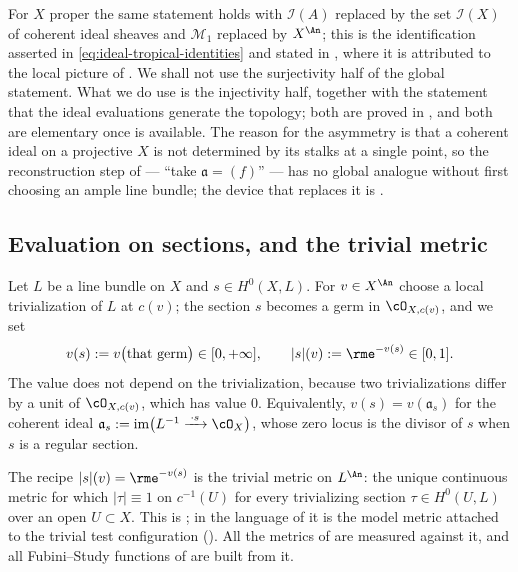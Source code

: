 \begin{remark}
\label{rem:ch32-global-tropical}
For $X$ proper the same statement holds with $\mathcal I(A)$ replaced by
the set $\mathcal I(X)$ of coherent ideal sheaves and
$\mathcal M_1$ replaced by $X^{\An}$; this is the identification asserted
in \eqref{eq:ideal-tropical-identities} and stated in
\cite[\S1.1.3]{BJ22}, where it is attributed to the local picture of
\cite[\S1.2]{JM12}.  We shall not use the surjectivity half of the global
statement.  What we do use is the injectivity half, together with the
statement that the ideal evaluations generate the topology; both are proved
in , and both are elementary once
 is available.  The reason for the asymmetry is
that a coherent ideal on a projective $X$ is not determined by its stalks
at a single point, so the reconstruction step of
 --- ``take $\mathfrak a=(f)$'' --- has
no global analogue without first choosing an ample line bundle; the device
that replaces it is .
\end{remark}

\subsection{Evaluation on sections, and the trivial metric}
\label{sec:ch32-sections}

Let $L$ be a line bundle on $X$ and $s\in H^0(X,L)$.  For
$v\in X^{\An}$ choose a local trivialization of $L$ at $c(v)$; the
section $s$ becomes a germ in $\cO_{X,c(v)}$, and we set
\[
 v(s):=v\bigl(\text{that germ}\bigr)\in[0,+\infty],
 \qquad
 |s|(v):=\rme^{-v(s)}\in[0,1].
\]
The value does not depend on the trivialization, because two trivializations
differ by a unit of $\cO_{X,c(v)}$, which has value $0$.  Equivalently,
$v(s)=v(\mathfrak a_s)$ for the coherent ideal
$\mathfrak a_s:=\operatorname{im}\bigl(L^{-1}\xrightarrow{\;\cdot s\;}
\cO_X\bigr)$, whose zero locus is the divisor of $s$ when $s$ is a
regular section.

\begin{remark}
\label{rem:ch32-trivial-metric}
The recipe $|s|(v)=\rme^{-v(s)}$ is the trivial metric on $L^{\An}$: the
unique continuous metric for which $|\tau|\equiv1$ on $c^{-1}(U)$ for
every trivializing section $\tau\in H^0(U,L)$ over an open $U\subset X$.
This is \cite[Remark~1.24]{BJ22}; in the language of  it
is the model metric attached to the trivial test configuration
().  All the metrics of  are
measured against it, and all Fubini--Study functions of
 are built from it.
\end{remark}

